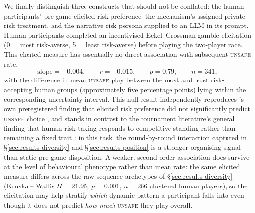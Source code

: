 \documentclass[sigconf]{aamas}
\newcommand{\Unsafe}{\textsc{unsafe}}
\begin{document}
We finally distinguish three constructs that should not be conflated: the
human participants' pre-game elicited risk preference, the mechanism's
assigned private-risk treatment, and the narrative risk persona supplied to
an LLM in its prompt. Human participants completed an incentivised
Eckel--Grossman gamble elicitation (0 = most risk-averse, 5 = least
risk-averse) before playing the two-player race. This elicited measure has
essentially no direct association with subsequent \Unsafe{} rate,
\[
    \text{slope}=-0.004,\qquad r=-0.015,\qquad p=0.79,\qquad n=341,
\]
with the difference in mean \Unsafe{} play between the most and least
risk-accepting human groups (approximately five percentage points) lying
within the corresponding uncertainty interval. This null result
independently reproduces \citeauthor{falling_behind_unsafe}'s own
preregistered finding that elicited risk preference did not significantly
predict \Unsafe{} choice \citep{falling_behind_unsafe}, and stands in
contrast to the tournament literature's general finding that human
risk-taking responds to competitive standing rather than remaining a fixed
trait \citep{risk-taking_touraments,risk_taking_in_competition,%
competition_and_risk-taking}: in this task, the round-by-round interaction
captured in \S\ref{sec:results-diversity} and \S\ref{sec:results-position}
is a stronger organising signal than static pre-game disposition. A
weaker, second-order association does survive at the level of behavioural
phenotype rather than mean rate: the same elicited measure differs across
the raw-sequence archetypes of \S\ref{sec:results-diversity} (Kruskal--
Wallis $H=21.95$, $p=0.001$, $n=286$ clustered human players), so the
elicitation may help stratify \emph{which} dynamic pattern a participant
falls into even though it does not predict \emph{how much} \Unsafe{} they
play overall.
\end{document}
